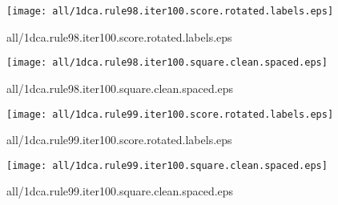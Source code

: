 \documentclass{article}
\begin{document}
\begin{center}
\begin{minipage}{\textwidth}
\texttt{[image: all/1dca.rule98.iter100.score.rotated.labels.eps]}
\end{minipage}
\end{center}
{\footnotesize all/1dca.rule98.iter100.score.rotated.labels.eps}
\begin{center}
\begin{minipage}{\textwidth}
\texttt{[image: all/1dca.rule98.iter100.square.clean.spaced.eps]}
\end{minipage}
\end{center}
{\footnotesize all/1dca.rule98.iter100.square.clean.spaced.eps}
\begin{center}
\begin{minipage}{\textwidth}
\texttt{[image: all/1dca.rule99.iter100.score.rotated.labels.eps]}
\end{minipage}
\end{center}
{\footnotesize all/1dca.rule99.iter100.score.rotated.labels.eps}
\begin{center}
\begin{minipage}{\textwidth}
\texttt{[image: all/1dca.rule99.iter100.square.clean.spaced.eps]}
\end{minipage}
\end{center}
{\footnotesize all/1dca.rule99.iter100.square.clean.spaced.eps}
\end{document}
